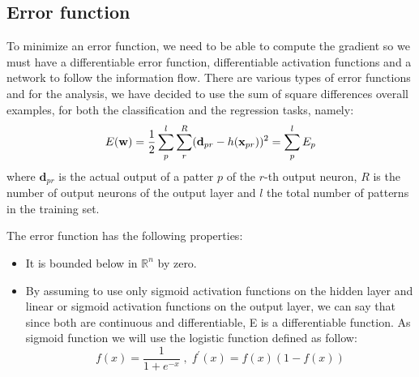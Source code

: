 \subsection{Error function}
\label{sec:error_f}
To minimize an error function, we need to be able to compute the gradient so we must have a differentiable error function, differentiable activation functions and a network to follow the information flow. There are various types of error functions and for the analysis, we have decided to use the sum of square differences overall examples, for both the classification and the regression tasks, namely:
\begin{equation}
\label{eq:error_function}
E(\bold{w})= \frac{1}{2} \sum_{p}^l \sum_{r}^R (\mathbf{d}_{pr}-h(\mathbf{x}_{pr}))^2  =   \sum_{p}^l E_p
\end{equation}
where $\mathbf{d}_{pr}$ is the actual output of a patter $p$ of the $r$-th output neuron, $R$ is the number of output neurons of the output layer and $l$ the total number of patterns in the training set.

The error function has the following properties:
\begin{itemize}
    \item It is bounded below in $\mathbb{R}^n$ by zero.
    \item By assuming to use only sigmoid activation functions on the hidden layer and linear or sigmoid activation functions on the output layer, we can say that since both are continuous and differentiable, E is a differentiable function. As sigmoid function we will use the logistic function defined as follow:
    $$ f(x) = \frac{1}{1+e^{-x}} \;,\; f^{'}(x) = f(x)(1 - f(x))$$
\end{itemize}


